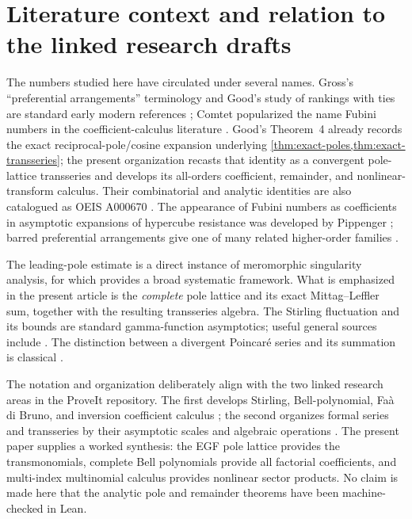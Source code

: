 \documentclass[11pt,a4paper,oneside]{article}
\theoremstyle{definition}
\theoremstyle{remark}
\begin{document}
\section{Literature context and relation to the linked research drafts}
\label{sec:literature}
The numbers studied here have circulated under several names.  Gross's
``preferential arrangements'' terminology and Good's study of rankings with
ties are standard early modern references
\cite{Gross1962,Good1975}; Comtet popularized the name Fubini numbers in the
coefficient-calculus literature \cite{Comtet1974}.  Good's Theorem~4
already records the exact reciprocal-pole/cosine expansion underlying
\cref{thm:exact-poles,thm:exact-transseries}; the present organization recasts
that identity as a convergent pole-lattice transseries and develops its
all-orders coefficient, remainder, and nonlinear-transform calculus.
Their combinatorial and analytic identities are also catalogued as OEIS
A000670 \cite{OEIS}.  The appearance of Fubini numbers as coefficients in
asymptotic expansions of
hypercube resistance was developed by Pippenger \cite{Pippenger2010}; barred
preferential arrangements give one of many related higher-order families
\cite{Ahlbach2013}.

The leading-pole estimate is a direct instance of meromorphic singularity
analysis, for which \cite{FlajoletSedgewick2009} provides a broad systematic
framework.  What is emphasized in the present article is the \emph{complete}
pole lattice and its exact Mittag--Leffler sum, together with the resulting
transseries algebra.  The Stirling fluctuation and its bounds are standard
gamma-function asymptotics; useful general sources include
\cite{DLMF,Olver1997,WhittakerWatson1927,ParisKaminski2001}.  The distinction
between a divergent Poincar\'e series and its summation is classical
\cite{Hardy1949}.

The notation and organization deliberately align with the two linked
research areas in the ProveIt repository.  The first develops Stirling,
Bell-polynomial, Fa\`a di Bruno, and inversion coefficient calculus
\cite{ProveItCoefficient}; the second organizes formal series and transseries
by their asymptotic scales and algebraic operations \cite{ProveItTransseries}.
The present paper supplies a worked synthesis: the EGF pole lattice provides
the transmonomials, complete Bell polynomials provide all factorial
coefficients, and multi-index multinomial calculus provides nonlinear sector
products.  No claim is made here that the analytic pole and remainder
theorems have been machine-checked in Lean.
\end{document}
